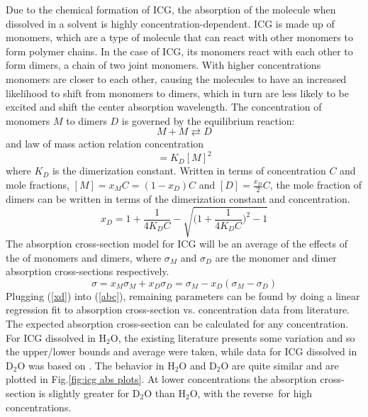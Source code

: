 Due to the chemical formation of ICG, the absorption of the molecule when dissolved in a solvent is highly concentration-dependent. ICG is made up of monomers, which are a type of molecule that can react with other monomers to form polymer chains. In the case of ICG, its monomers react with each other to form dimers, a chain of two joint monomers.
With higher concentrations monomers are closer to each other, causing the molecules to have an increased likelihood to shift from monomers to dimers, which in turn are less likely to be excited and shift the center absorption wavelength. The concentration of monomers $M$ to dimers $D$ is governed by the equilibrium reaction:
\begin{equation}
	M+M\rightleftarrows D
\end{equation}
and law of mass action relation concentration
\begin{equation}
	[D] =  K_D[M]^2
\end{equation}
where $K_D$ is the dimerization constant. Written in terms of concentration $C$ and mole fractions, $[M] = x_MC= (1-x_D)C $ and $[D]=\frac{x_D}{2}C$, the  mole fraction of dimers can be written in terms of the dimerization constant and concentration.
\begin{equation}
	x_D = 1 + \frac{1}{4K_DC} - \sqrt{\big( 1 + \frac{1}{4K_DC}\big)^2-1}
	\label{xd}
\end{equation}
The absorption cross-section model for ICG\cite{mauerer, philip} will be an average of the effects of the of monomers and dimers, where $\sigma_M$ and $\sigma_D$ are the monomer and dimer absorption cross-sections respectively.
\begin{equation}
	\sigma = x_M \sigma_M + x_D \sigma_D = \sigma_M - x_D(\sigma_M - \sigma_D)
	\label{abc}
\end{equation}
Plugging (\ref{xd}) into (\ref{abc}), remaining parameters can be found by doing a linear regression fit to absorption cross-section vs. concentration data from literature. The expected absorption cross-section can be calculated for any concentration. For ICG dissolved in H${}_2$O, the existing literature presents some variation and so the upper/lower bounds and average were taken, while data for ICG dissolved in D${}_2$O was based on \cite{holzer}. The behavior in H${}_2$O and D${}_2$O are quite similar and are plotted in Fig.\ref{fig:icg abs plots}. At lower concentrations the absorption cross-section is slightly greater for D${}_2$O than H${}_2$O, with the reverse for high concentrations.
\clearpage
